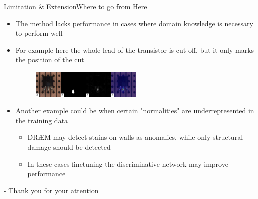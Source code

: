 \begin{frame}{Limitation \& Extension}{Where to go from Here}
    \begin{itemize}[<+->]
        \item The method lacks performance in cases where domain knowledge is necessary to perform well
        \item For example here the whole lead of the transistor is cut off, but it only marks the position of the cut
        \begin{figure}
            \centering
            \includegraphics[width=0.5\textwidth]{pitch/transistor.png}
        \end{figure}
        \item Another example could be when certain "normalities" are underrepresented in the training data
        \begin{itemize}
            \item DRÆM may detect stains on walls as anomalies, while only structural damage should be detected
            \item In these cases finetuning the discriminative network may improve performance
        \end{itemize}
    \end{itemize}
\end{frame}

\begin{frame}[t,titleimage]{-}
    Thank you for your attention
\end{frame}